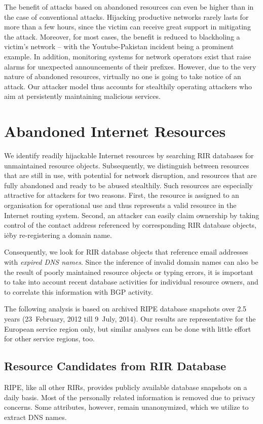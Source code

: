 \documentclass{llncs}
\begin{document}
The benefit of attacks based on abandoned resources can even be higher than in
the case of conventional attacks. Hijacking productive networks rarely lasts
for more than a few hours, since the victim can receive great support in
mitigating the attack.  Moreover, for most cases, the benefit is reduced to
blackholing a victim's network -- with the Youtube-Pakistan incident being a
prominent example. In addition, monitoring systems for network operators exist
that raise alarms for unexpected announcements of their prefixes. However, due
to the very nature of abandoned resources, virtually no one is going to take
notice of an attack. Our attacker model  thus accounts for stealthily operating
attackers who aim at persistently maintaining malicious services.

\section{Abandoned Internet Resources} \label{sec:resources}
We identify readily hijackable Internet resources by searching RIR databases for unmaintained resource objects. Subsequently, we distinguish between resources that are still in use, with potential for network disruption, and resources that are fully abandoned and ready to be abused stealthily. Such resources are especially attractive for attackers for two reasons. First, the resource is assigned to an organisation for operational use and thus represents a valid resource in the Internet routing system. Second, an attacker can easily claim ownership by taking control of the contact address referenced by corresponding RIR database objects, i\.e\. by re-registering a domain name. 

Consequently, we look for RIR database objects that reference email addresses with \textit{expired DNS names}. 
Since the inference of invalid domain names can also be the result of poorly maintained resource objects or typing errors, it is important to take into account recent database activities for individual resource owners, and to correlate this information with BGP activity.

The following analysis is based on archived RIPE database snapshots over 2.5 years (23~February, 2012 till 9~July, 2014). Our results are representative for the European service region only, but similar analyses can be done with little effort for other service regions, too.

\subsection{Resource Candidates from RIR Database}
RIPE, like all other RIRs, provides publicly available database snapshots on a daily basis. Most of the personally related information is removed due to privacy concerns. Some attributes, however, remain unanonymized, which we utilize to extract DNS names.
\end{document}
